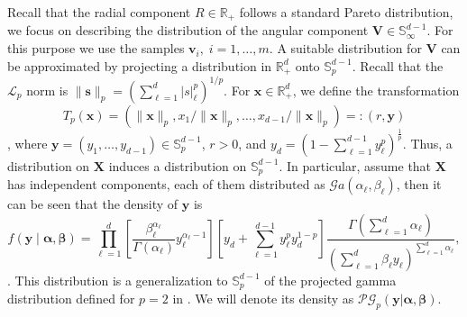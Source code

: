 Recall that the radial component $R \in {\mathbb R}_+$ follows a standard 
    Pareto distribution, we focus on describing the distribution of the angular 
    component $\bm{V}\in {\mathbb S}_{\infty}^{d-1}$. For this purpose we use 
    the samples $\bm{v}_i ,\; i=1, \ldots ,m$. A suitable distribution for 
    $\bm{V}$ can be approximated by projecting a distribution in 
    $\mathbb{R}_+^d$ onto $\mathbb{S}_{p}^{d-1}$. Recall that the 
    $\mathcal{L}_p$ norm is 
    $\lVert \bm{s} \rVert_p = (\sum_{\ell = 1}^d \rvert s\lvert_{\ell}^p)^{1/p}$. 
    For $\bm{x} \in\mathbb{R}_+^d$, we define the transformation 
    \[T_p(\bm{x}) = (\lVert\bm{x}\rVert_p, x_1/\lVert\bm{x}\rVert_p, \ldots, 
    x_{d-1}/\lVert\bm{x}\rVert_p)=: (r,\bm{y})\], where
    $\bm{y} = (y_1, \ldots , y_{d-1}) \in \mathbb{S}_{p}^{d-1}$, $r>0$, and 
    $y_d = \left(1 - \sum_{\ell = 1}^{d-1}y_\ell^p\right)^{\frac{1}{p}}$.
    Thus, a distribution on $\bm{X}$ induces a distribution on 
    $\mathbb{S}_{p}^{d-1}$. In particular, assume that $\bm{X}$ has independent 
    components, each of them distributed as 
    $\mathcal{G}a(\alpha_{\ell}, \beta_{\ell})$, then it can be seen that the 
    density of $\bm{y}$ is
    \begin{equation}
        \label{eqn:projgamma}
        f(\bm{ y}\mid\bm{ \alpha},\bm{ \beta}) =
            \prod_{\ell = 1}^d\left[
                \frac{\beta_{\ell}^{\alpha_{\ell}}}{\Gamma(\alpha_{\ell})}
                y_{\ell}^{\alpha_{\ell} - 1}
                \right]
            \left[y_d +
                {\textstyle \sum}_{\ell = 1}^{d-1}y_{\ell}^py_d^{1 - p}
                \right]
            \frac{\Gamma({\textstyle\sum}_{\ell = 1}^d\alpha_{\ell})}{
                    \left({\textstyle\sum}_{\ell = 1}^d
                \beta_{\ell}y_{\ell}\right)^{
                    {\scriptstyle\sum_{\ell = 1}^d \alpha_{\ell}}}
                },
  \end{equation}
    \citep[see,][for details]{trubey:pg}. This distribution is a generalization 
    to $\mathbb{S}_{p}^{d-1}$ of the projected gamma distribution defined for 
    $p=2$ in \cite{nunez2019}. We will denote its density as 
    $\mathcal{PG}_p(\bm{y}|\bm{\alpha},\bm{\beta})$.


